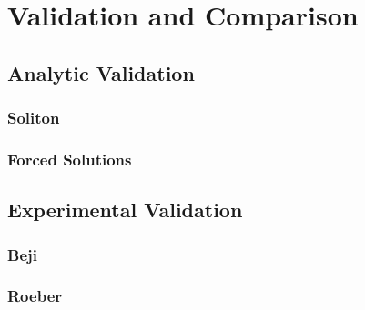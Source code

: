 
\chapter{Validation and Comparison}
\label{chp:NumMethodComp}

\section{Analytic Validation}

\subsection{Soliton}

\subsection{Forced Solutions}


\section{Experimental Validation}

\subsection{Beji}

\subsection{Roeber}



